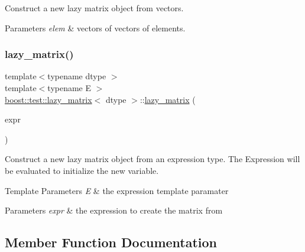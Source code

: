 Construct a new lazy matrix object from vectors. 


\begin{DoxyParams}{Parameters}
{\em elem} & vectors of vectors of elements. \\
\hline
\end{DoxyParams}
\mbox{\label{classboost_1_1test_1_1lazy__matrix_a11af68d859c54c6caa37b44d7a77d48b}} 
\subsubsection{\texorpdfstring{lazy\_matrix()}{lazy\_matrix()}\hspace{0.1cm}{\footnotesize\ttfamily [4/4]}}
{\footnotesize\ttfamily template$<$typename dtype $>$ \\
template$<$typename E $>$ \\
\mbox{\hyperlink{classboost_1_1test_1_1lazy__matrix}{boost\+::test\+::lazy\+\_\+matrix}}$<$ dtype $>$\+::\mbox{\hyperlink{classboost_1_1test_1_1lazy__matrix}{lazy\+\_\+matrix}} (\begin{DoxyParamCaption}\item[{\mbox{\hyperlink{classboost_1_1test_1_1expression}{expression}}$<$ E $>$ const \&}]{expr }\end{DoxyParamCaption})\hspace{0.3cm}{\ttfamily [inline]}}



Construct a new lazy matrix object from an expression type. The Expression will be evaluated to initialize the new variable. 


\begin{DoxyTemplParams}{Template Parameters}
{\em E} & the expression template paramater \\
\hline
\end{DoxyTemplParams}

\begin{DoxyParams}{Parameters}
{\em expr} & the expression to create the matrix from \\
\hline
\end{DoxyParams}


\subsection{Member Function Documentation}
\mbox{\label{classboost_1_1test_1_1lazy__matrix_af15683b4f6c83dfb4384c73f5863890b}} 

